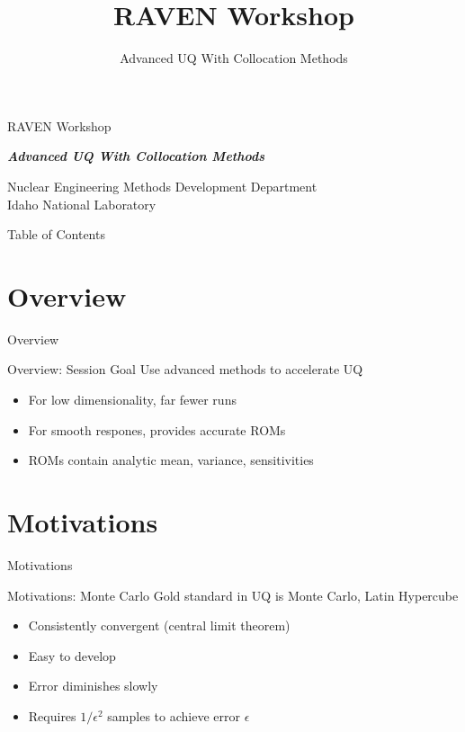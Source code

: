 \documentclass[t,9pt,svgnames]{beamer}
\makeatletter
\newcommand{\mytoc}{\@starttoc{toc}}
\makeatother
\begin{document}
\title[RAVEN Workshop]{RAVEN Workshop}
\subtitle{Advanced UQ With Collocation Methods}

\begin{titleframe}{RAVEN Workshop}

{\bfseries\emph{Advanced UQ With Collocation Methods}}

\vfill
{\small Nuclear Engineering Methods Development Department\\
Idaho National Laboratory}
\end{titleframe}

\begin{frame}{Table of Contents}
\mytoc
\end{frame}

%
%
\section{Overview}
\begin{frame}{Overview}
\end{frame}

\begin{frame}{Overview: Session Goal}
  Use advanced methods to accelerate UQ
  \begin{itemize}
    \item For low dimensionality, far fewer runs
    \item For smooth respones, provides accurate ROMs
    \item ROMs contain analytic mean, variance, sensitivities
  \end{itemize}
\end{frame}
%
%
\section{Motivations}
\begin{frame}{Motivations}
\end{frame}

\begin{frame}{Motivations: Monte Carlo}
  Gold standard in UQ is Monte Carlo, Latin Hypercube
  \begin{itemize}
    \item Consistently convergent (central limit theorem)
    \item Easy to develop
    \item Error diminishes slowly
    \item Requires $1/\epsilon^2$ samples to achieve error $\epsilon$
  \end{itemize}
\end{frame}
\end{document}
